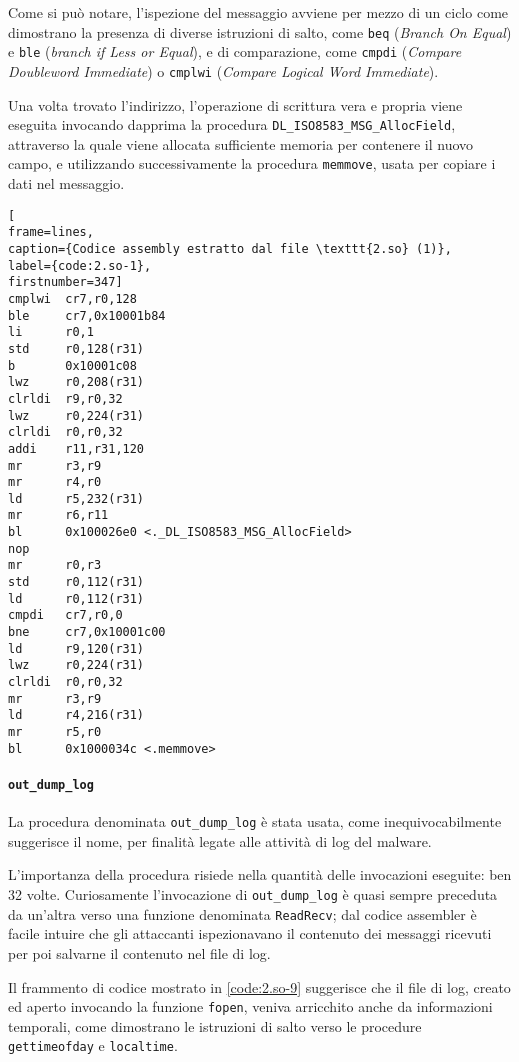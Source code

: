 \documentclass[10pt,a4paper, titlepage]{report}
\begin{document}
Come si può notare, l'ispezione del messaggio avviene per mezzo di un ciclo come dimostrano la presenza di diverse istruzioni di salto, come \texttt{beq} (\textit{Branch On Equal}) e \texttt{ble} (\textit{branch if Less or Equal}), e di comparazione, come \texttt{cmpdi} (\textit{Compare Doubleword Immediate}) o \texttt{cmplwi} (\textit{Compare Logical Word Immediate}).

Una volta trovato l'indirizzo, l'operazione di scrittura vera e propria viene eseguita invocando dapprima la procedura \texttt{DL\_ISO8583\_MSG\_AllocField}, attraverso la quale viene allocata sufficiente memoria per contenere il nuovo campo, e utilizzando successivamente la procedura \texttt{memmove}, usata per copiare i dati nel messaggio.

\begin{lstlisting}[
frame=lines, 
caption={Codice assembly estratto dal file \texttt{2.so} (1)}, 
label={code:2.so-1},
firstnumber=347]
cmplwi  cr7,r0,128
ble     cr7,0x10001b84
li      r0,1
std     r0,128(r31)
b       0x10001c08
lwz     r0,208(r31)
clrldi  r9,r0,32
lwz     r0,224(r31)
clrldi  r0,r0,32
addi    r11,r31,120
mr      r3,r9
mr      r4,r0
ld      r5,232(r31)
mr      r6,r11
bl      0x100026e0 <._DL_ISO8583_MSG_AllocField>
nop
mr      r0,r3
std     r0,112(r31)
ld      r0,112(r31)
cmpdi   cr7,r0,0
bne     cr7,0x10001c00
ld      r9,120(r31)
lwz     r0,224(r31)
clrldi  r0,r0,32
mr      r3,r9
ld      r4,216(r31)
mr      r5,r0
bl      0x1000034c <.memmove>
\end{lstlisting}

\paragraph{\texttt{out\_dump\_log}}\label{subsubsection:outDumpLog}

La procedura denominata \texttt{out\_dump\_log} è stata usata, come inequivocabilmente suggerisce il nome, per finalità legate alle attività di log del malware.

L'importanza della procedura risiede nella quantità delle invocazioni eseguite: ben 32 volte. Curiosamente l'invocazione di \texttt{out\_dump\_log} è quasi sempre preceduta da un'altra verso una funzione denominata \texttt{ReadRecv}; dal codice assembler è facile intuire che gli attaccanti ispezionavano il contenuto dei messaggi ricevuti per poi salvarne il contenuto nel file di log.

Il frammento di codice mostrato in \ref{code:2.so-9} suggerisce che il file di log, creato ed aperto invocando la funzione \texttt{fopen}, veniva arricchito anche da informazioni temporali, come dimostrano le istruzioni di salto verso le procedure \texttt{gettimeofday} e \texttt{localtime}. 
\end{document}

